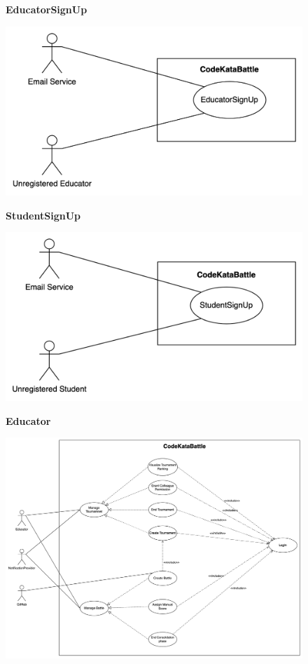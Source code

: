 \documentclass{Configuration_Files/Template}
\begin{document}
\begin{figure}[H]
\textbf{EducatorSignUp}\par\medskip
\includegraphics[scale = 0.45]{Images/UseCaseDiagrams/EducatorSignUpUseCaseDiagram.png}\\
\centering
\end{figure}
\begin{figure}[H]
\textbf{StudentSignUp}\par\medskip
\includegraphics[scale = 0.45]{Images/UseCaseDiagrams/StudentSignUpUseCaseDiagram.png}\\
\centering
\end{figure}
\begin{figure}[H]
\textbf{Educator}\par\medskip
\includegraphics[scale = 0.45]{Images/UseCaseDiagrams/EducatorUseCaseDiagram.png}\\
\centering
\end{figure}
\end{document}
